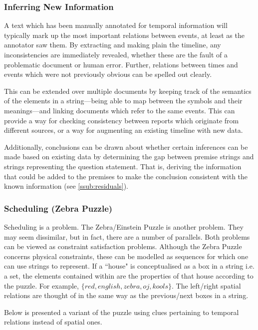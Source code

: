 \documentclass[a4paper,12pt,leqno]{article}
\begin{document}
\subsubsection{Inferring New Information}\label{ssub:inferring}
A text which has been manually annotated for temporal information will typically mark up the most important relations between events, at least as the annotator saw them. By extracting and making plain the timeline, any inconsistencies are immediately revealed, whether these are the fault of a problematic document or human error. Further, relations between times and events which were not previously obvious can be spelled out clearly.

This can be extended over multiple documents by keeping track of the semantics of the elements in a string---being able to map between the symbols and their meanings---and linking documents which refer to the same events. This can provide a way for checking consistency between reports which originate from different sources, or a way for augmenting an existing timeline with new data.

Additionally, conclusions can be drawn about whether certain inferences can be made based on existing data by determining the gap between premise strings and strings representing the question statement. That is, deriving the information that could be added to the premises to make the conclusion consistent with the known information (see \cref{ssub:residuals}).

\subsubsection{Scheduling (Zebra Puzzle)}\label{ssub:zebra}
Scheduling is a problem. The Zebra/Einstein Puzzle is another problem. They may seem dissimilar, but in fact, there are a number of parallels. Both problems can be viewed as constraint satisfaction problems. Although the Zebra Puzzle concerns physical constraints, these can be modelled as sequences for which one can use strings to represent. If a ``house" is conceptualised as a box in a string i.e. a set, the elements contained within are the properties of that house according to the puzzle. For example, $\{red, english, zebra, oj, kools\}$. The left/right spatial relations are thought of in the same way as the previous/next boxes in a string.

Below is presented a variant of the puzzle using clues pertaining to temporal relations instead of spatial ones.
\end{document}
